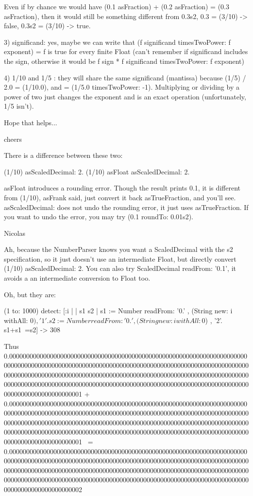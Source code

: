 \documentclass[a4paper,10pt,twoside]{book}
\begin{document}
Even if by chance we would have  (0.1 asFraction) + (0.2 asFraction) =
(0.3 asFraction), then it would still be something different from
0.3s2, 0.3 = (3/10) -> false, 0.3s2 = (3/10) -> true.

3) significand: yes, maybe we can write that (f significand
timesTwoPower: f exponent) = f is true for every finite Float (can't
remember if significand includes the sign, otherwise it would be f
sign * f significand timesTwoPower: f exponent)

4) 1/10 and 1/5 : they will share the same significand (mantissa)
because (1/5) / 2.0 = (1/10.0), and = (1/5.0 timesTwoPower: -1).
Multiplying or dividing by a power of two just changes the exponent
and is an exact operation (unfortunately, 1/5 isn't).

Hope that helps...

cheers

There is a difference between these two:

(1/10) asScaledDecimal: 2.
(1/10) asFloat asScaledDecimal: 2.

asFloat introduces a rounding error.
Though the result prints 0.1, it is different from (1/10), asFrank
said, just convert it back asTrueFraction, and you'll see.
asScaledDecimal: does not undo the rounding error, it just uses asTrueFraction.
If you want to undo the error, you may try (0.1 roundTo: 0.01s2).

Nicolas



Ah, because the NumberParser knows you want a ScaledDecimal with the
s2 specification, so it just doesn't use an intermediate Float, but
directly convert (1/10) asScaledDecimal: 2.
You can also try ScaledDecimal readFrom: '0.1', it avoids a an
intermediate conversion to Float too.


Oh, but they are:

(1 to: 1000) detect: [:i |
	| s1 s2 |
	s1 := Number readFrom: '0.' , (String new: i withAll: $0) , '1'.
	s2 := Number readFrom: '0.' , (String new: i withAll: $0) , '2'.
	s1+s1~=s2]
->  308

Thus 0.000000000000000000000000000000000000000000000000000000000000000000000000000000000000000000000000000000000000000000000000000000000000000000000000000000000000000000000000000000000000000000000000000000000000000000000000000000000000000000000000000000000000000000000000000000000000000000000000000000000000000000001
+ 0.000000000000000000000000000000000000000000000000000000000000000000000000000000000000000000000000000000000000000000000000000000000000000000000000000000000000000000000000000000000000000000000000000000000000000000000000000000000000000000000000000000000000000000000000000000000000000000000000000000000000000000001
~= 0.000000000000000000000000000000000000000000000000000000000000000000000000000000000000000000000000000000000000000000000000000000000000000000000000000000000000000000000000000000000000000000000000000000000000000000000000000000000000000000000000000000000000000000000000000000000000000000000000000000000000000000002


\ifx\wholebook\relax\else
   
   
\end{document}
